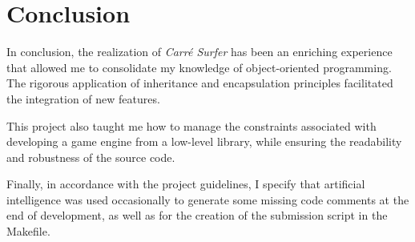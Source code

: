 \section{Conclusion}

In conclusion, the realization of \textit{Carré Surfer} has been an enriching experience that allowed me to consolidate my knowledge of object-oriented programming. The rigorous application of inheritance and encapsulation principles facilitated the integration of new features.

This project also taught me how to manage the constraints associated with developing a game engine from a low-level library, while ensuring the readability and robustness of the source code.

Finally, in accordance with the project guidelines, I specify that artificial intelligence was used occasionally to generate some missing code comments at the end of development, as well as for the creation of the submission script in the Makefile.

